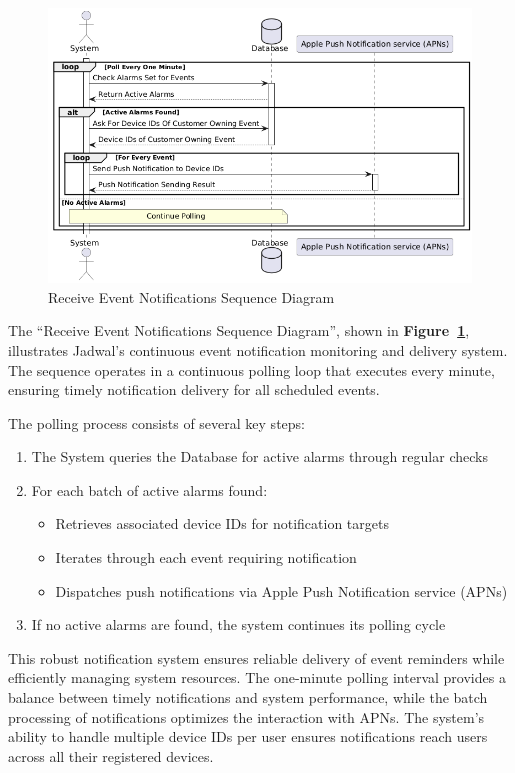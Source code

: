 \begin{figure}[!h]
  \centering
  \includegraphics[width=\textwidth]{images/docs/diagrams/sequence-diagrams/all-sequence-diagrams/Receive Event Notifications.png}
  \caption{Receive Event Notifications Sequence Diagram}
  \label{fig:seq/receive-event-notifications}
\end{figure}

The ``Receive Event Notifications Sequence Diagram'', shown in \textbf{Figure~\ref{fig:seq/receive-event-notifications}}, illustrates Jadwal's continuous event notification monitoring and delivery system. The sequence operates in a continuous polling loop that executes every minute, ensuring timely notification delivery for all scheduled events.

The polling process consists of several key steps:
\begin{enumerate}
  \item The System queries the Database for active alarms through regular checks
  \item For each batch of active alarms found:
        \begin{itemize}
          \item Retrieves associated device IDs for notification targets
          \item Iterates through each event requiring notification
          \item Dispatches push notifications via Apple Push Notification service (APNs)
        \end{itemize}
  \item If no active alarms are found, the system continues its polling cycle
\end{enumerate}

This robust notification system ensures reliable delivery of event reminders while efficiently managing system resources. The one-minute polling interval provides a balance between timely notifications and system performance, while the batch processing of notifications optimizes the interaction with APNs. The system's ability to handle multiple device IDs per user ensures notifications reach users across all their registered devices.